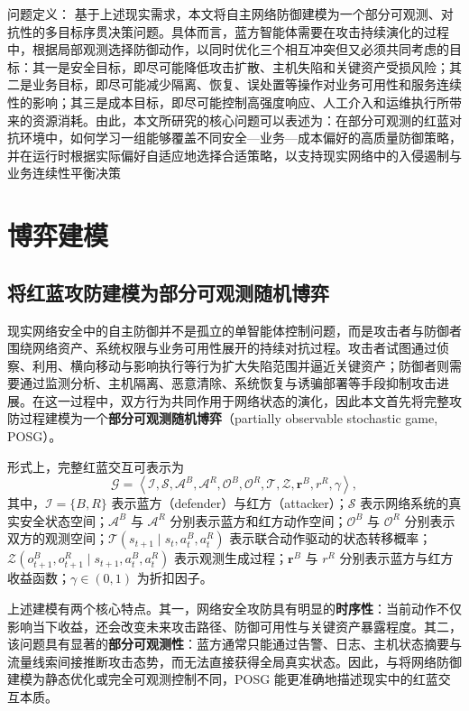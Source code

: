 \documentclass[12pt,a4paper]{article}
\begin{document}
问题定义：
基于上述现实需求，本文将自主网络防御建模为一个部分可观测、对抗性的多目标序贯决策问题。具体而言，蓝方智能体需要在攻击持续演化的过程中，根据局部观测选择防御动作，以同时优化三个相互冲突但又必须共同考虑的目标：其一是安全目标，即尽可能降低攻击扩散、主机失陷和关键资产受损风险；其二是业务目标，即尽可能减少隔离、恢复、误处置等操作对业务可用性和服务连续性的影响；其三是成本目标，即尽可能控制高强度响应、人工介入和运维执行所带来的资源消耗。由此，本文所研究的核心问题可以表述为：在部分可观测的红蓝对抗环境中，如何学习一组能够覆盖不同安全—业务—成本偏好的高质量防御策略，并在运行时根据实际偏好自适应地选择合适策略，以支持现实网络中的入侵遏制与业务连续性平衡决策


\section{博弈建模}

\subsection{将红蓝攻防建模为部分可观测随机博弈}

现实网络安全中的自主防御并不是孤立的单智能体控制问题，而是攻击者与防御者围绕网络资产、系统权限与业务可用性展开的持续对抗过程。攻击者试图通过侦察、利用、横向移动与影响执行等行为扩大失陷范围并逼近关键资产；防御者则需要通过监测分析、主机隔离、恶意清除、系统恢复与诱骗部署等手段抑制攻击进展。在这一过程中，双方行为共同作用于网络状态的演化，因此本文首先将完整攻防过程建模为一个\textbf{部分可观测随机博弈}（partially observable stochastic game, POSG）。

形式上，完整红蓝交互可表示为
\begin{equation}
\mathcal{G}
=
\left\langle
\mathcal{I},
\mathcal{S},
\mathcal{A}^{B},
\mathcal{A}^{R},
\mathcal{O}^{B},
\mathcal{O}^{R},
\mathcal{T},
\mathcal{Z},
\mathbf{r}^{B},
r^{R},
\gamma
\right\rangle,
\end{equation}
其中，$\mathcal{I}=\{B,R\}$ 表示蓝方（defender）与红方（attacker）；$\mathcal{S}$ 表示网络系统的真实安全状态空间；$\mathcal{A}^{B}$ 与 $\mathcal{A}^{R}$ 分别表示蓝方和红方动作空间；$\mathcal{O}^{B}$ 与 $\mathcal{O}^{R}$ 分别表示双方的观测空间；$\mathcal{T}(s_{t+1}\mid s_t,a_t^B,a_t^R)$ 表示联合动作驱动的状态转移概率；$\mathcal{Z}(o_{t+1}^B,o_{t+1}^R\mid s_{t+1},a_t^B,a_t^R)$ 表示观测生成过程；$\mathbf{r}^{B}$ 与 $r^{R}$ 分别表示蓝方与红方收益函数；$\gamma\in(0,1)$ 为折扣因子。

上述建模有两个核心特点。其一，网络安全攻防具有明显的\textbf{时序性}：当前动作不仅影响当下收益，还会改变未来攻击路径、防御可用性与关键资产暴露程度。其二，该问题具有显著的\textbf{部分可观测性}：蓝方通常只能通过告警、日志、主机状态摘要与流量线索间接推断攻击态势，而无法直接获得全局真实状态。因此，与将网络防御建模为静态优化或完全可观测控制不同，POSG 能更准确地描述现实中的红蓝交互本质。
\end{document}
